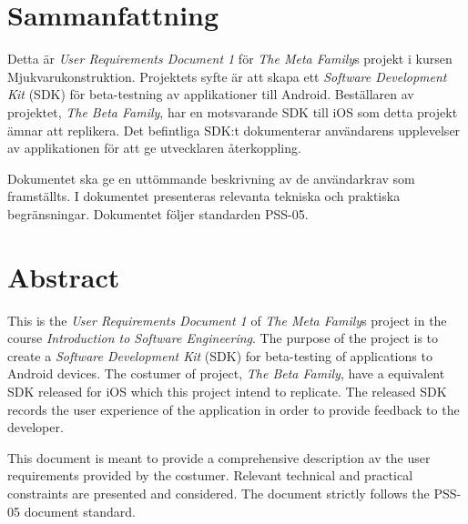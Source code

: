 \section*{Sammanfattning} %
Detta är \textit{User Requirements Document 1} för \textit{The Meta Family}s projekt i kursen Mjukvarukonstruktion. Projektets syfte är att skapa ett \textit{Software Development Kit} (SDK) för beta-testning av applikationer till Android. Beställaren av projektet, \textit{The Beta Family}, har en motsvarande SDK till iOS som detta projekt ämnar att replikera. Det befintliga SDK:t dokumenterar användarens upplevelser av applikationen för att ge utvecklaren återkoppling.

Dokumentet ska ge en uttömmande beskrivning av de användarkrav som framställts. I dokumentet presenteras relevanta tekniska och praktiska begränsningar. Dokumentet följer standarden PSS-05.

\section*{Abstract}
This is the \textit{User Requirements Document 1} of \textit{The Meta Family}s project in the course \textit{Introduction to Software Engineering}. The purpose of the project is to create a \textit{Software Development Kit} (SDK) for beta-testing of applications to Android devices. The costumer of project, \textit{The Beta Family}, have a equivalent SDK released for iOS which this project intend to replicate. The released SDK records the user experience of the application in order to provide feedback to the developer.

This document is meant to provide a comprehensive description av the user requirements provided by the costumer. Relevant technical and practical constraints are presented and considered. The document strictly follows the PSS-05 document standard.
